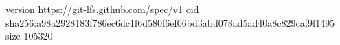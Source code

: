 version https://git-lfs.github.com/spec/v1
oid sha256:a98a2928183f786ec6dc1f6d580f6ef06bd3abd078ad5ad40a8c829caf9f1495
size 105320
